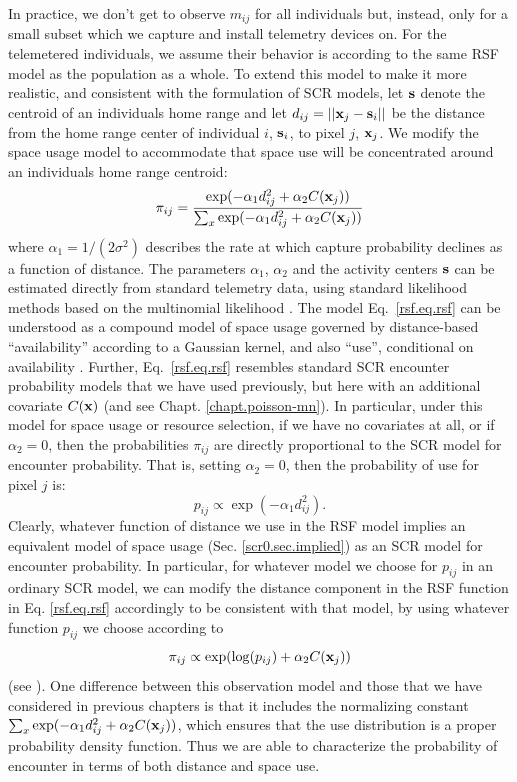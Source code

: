 In practice, we don't get to
observe $m_{ij}$ for all individuals but, instead, only for a small
subset which we capture and install telemetry devices on.
For the telemetered individuals, we assume their behavior is according
to the same RSF model as the population as a whole.
To extend this model to make it more realistic, and consistent with
the formulation of SCR models, let
${\bf s}$ denote the centroid of an individuals home range and let
$d_{ij} = ||{\bf x}_{j} - {\bf s}_{i}||$ be the distance from the home
range center of individual $i$, ${\bf s}_{i}$, to pixel $j$, ${\bf
  x}_{j}$. We modify the space usage model to accommodate that space
use will be concentrated around an individuals home range centroid:
\begin{equation}
 \pi_{ij} = \frac{ \exp( -\alpha_{1} d_{ij}^{2} +\alpha_{2} C({\bf x}_{j}) ) }
{ \sum_{x} \exp(-\alpha_{1} d_{ij}^{2} +\alpha_{2} C({\bf x}_{j}))}
\label{rsf.eq.rsf}
\end{equation}
where $\alpha_1=1/(2\sigma^2)$ describes the rate at which capture
probability declines as a function of distance.  The parameters
$\alpha_{1}$, $\alpha_{2}$ and the activity centers ${\bf s}$ can be
estimated directly from standard telemetry data, using standard
likelihood methods based on the multinomial likelihood
\citep{johnson_etal:2008}.
The model Eq.~\ref{rsf.eq.rsf} can be understood as a compound model
of space usage governed by distance-based ``availability'' according
to a Gaussian kernel, and also ``use'', conditional on availability
\citep{johnson_etal:2008, forester_etal:2009}.  Further,
Eq.~\ref{rsf.eq.rsf} resembles standard SCR encounter probability
models that we have used previously, but here with an additional
covariate $C({\bf x})$ (and see Chapt. \ref{chapt.poisson-mn}).  In
particular, under this model for space usage or resource selection, if
we have no covariates at all, or if $\alpha_{2} = 0$, then the
probabilities $\pi_{ij}$ are directly proportional to the SCR model
for encounter probability.  That is, setting $\alpha_{2} = 0$, then
the probability of use for pixel $j$ is:
\[
p_{ij} \propto  \exp( -\alpha_{1} d_{ij}^{2}).
\]
Clearly, whatever function of distance we use in the RSF model implies
an equivalent model of space usage (Sec. \ref{scr0.sec.implied}) as an
SCR model for encounter probability.  In particular, for whatever
model we choose for $p_{ij}$ in an ordinary SCR model, we can modify
the distance component in the RSF function in Eq. \ref{rsf.eq.rsf}
accordingly to be consistent with that model, by using whatever
function $p_{ij}$ we choose according to
\[
\pi_{ij} \propto \exp( \log(p_{ij}) + \alpha_{2} C({\bf x}_{j}) )
\]
(see \citep{forester_etal:2009}).
One difference between this observation model and those that we have
considered in previous chapters is that it includes the normalizing
constant $\sum_{x} \exp(-\alpha_{1} d_{ij}^{2} +\alpha_{2} C({\bf
  x}_{j}))$, which ensures that the use distribution is a proper
probability density function. Thus we are able to characterize the
probability of encounter in terms of both distance and space use.

